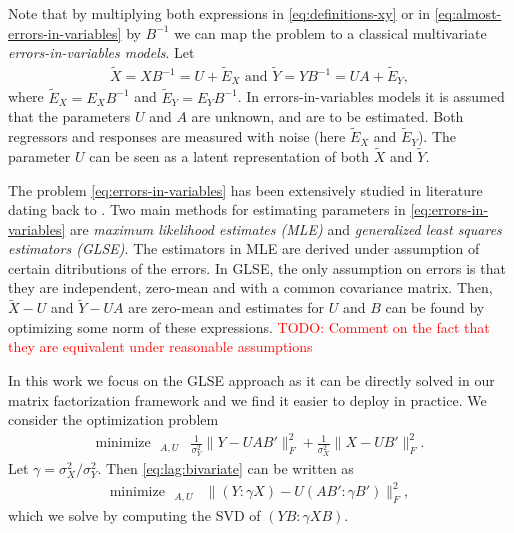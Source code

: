 \documentclass[preprint]{imsart}
\numberwithin{equation}{section}
\theoremstyle{plain}
\newcommand{\tr}[1]{{\textcolor{red}{#1}}}
\DeclareMathOperator*{\rank}{rank}
\DeclareMathOperator*{\minimize}{minimize\ \ }
\DeclareMathOperator*{\subjectto}{subject\ to\ \ }
\begin{document}
Note that by multiplying both expressions in \eqref{eq:definitions-xy} or in \eqref{eq:almost-errors-in-variables} by $B^{-1}$ we can map the problem to a classical multivariate {\em errors-in-variables models}. Let
\begin{align}\label{eq:errors-in-variables}
  \tilde{X} = XB^{-1} = U + \tilde{E}_X \text{ and } \tilde{Y} = YB^{-1} = UA + \tilde{E}_Y,
\end{align}  
where $\tilde{E}_X = E_XB^{-1}$ and $\tilde{E}_Y = E_YB^{-1}$. In errors-in-variables models it is assumed that the parameters $U$ and $A$ are unknown, and are to be estimated. Both regressors and responses are measured with noise (here $\tilde{E}_X$ and $\tilde{E}_Y$). The parameter $U$ can be seen as a latent representation of both $\tilde{X}$ and $\tilde{Y}$.

The problem \eqref{eq:errors-in-variables} has been extensively studied in literature dating back to \citet{adckock1978}. Two main methods for estimating parameters in \eqref{eq:errors-in-variables} are {\em maximum likelihood estimates (MLE)} and {\em generalized least squares estimators (GLSE)}. The estimators in MLE are derived under assumption of certain ditributions of the errors. In GLSE, the only assumption on errors is that they are independent, zero-mean and with a common covariance matrix. Then, $\tilde{X} - U$ and $\tilde{Y} - UA$ are zero-mean and estimates for $U$ and $B$ can be found by optimizing some norm of these expressions. \tr{TODO: Comment on the fact that they are equivalent under reasonable assumptions}


In this work we focus on the GLSE approach as it can be directly solved in our matrix factorization framework and we find it easier to deploy in practice. We consider the optimization problem
\begin{align}\label{eq:lag:bivariate}
  \minimize_{A,U} & \frac{1}{\sigma_Y^2} \| Y - UAB' \|_F^2 + \frac{1}{\sigma_X^2}\|X - UB' \|_F^2.%
\end{align}
Let $\gamma = \sigma_X^2 / \sigma_Y^2$. Then \eqref{eq:lag:bivariate} can be written as
\begin{align}\label{eq:lag:bivariate2}
  \minimize_{A,U} & \| (Y:\gamma X) - U(AB':\gamma B') \|_F^2,%
\end{align}
which we solve by computing the SVD of $(YB:\gamma XB)$.
\end{document}
